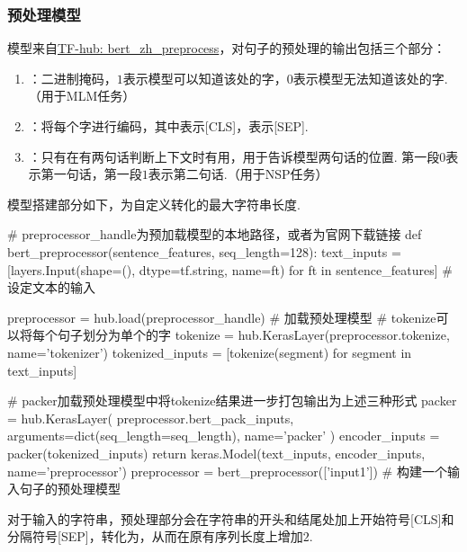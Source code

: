 \documentclass[12pt, a4paper, oneside]{ctexart}
\numberwithin{equation}{section}  %
\begin{document}
\subsubsection{预处理模型}
模型来自\href{https://tfhub.dev/tensorflow/bert_zh_preprocess/3}{TF-hub: bert\_zh\_preprocess}，对句子的预处理的输出包括三个部分：
\begin{enumerate}
  \item {}：二进制掩码，$1$表示模型可以知道该处的字，$0$表示模型无法知道该处的字.（用于MLM任务）
  \item {}：将每个字进行编码，其中表示[CLS]，表示[SEP].
  \item {}：只有在有两句话判断上下文时有用，用于告诉模型两句话的位置. 第一段$0$表示第一句话，第一段$1$表示第二句话.（用于NSP任务）
\end{enumerate}
模型搭建部分如下，为自定义转化的最大字符串长度.
\begin{pythoncode}
# preprocessor_handle为预加载模型的本地路径，或者为官网下载链接
def bert_preprocessor(sentence_features, seq_length=128):
    text_inputs = [layers.Input(shape=(), dtype=tf.string, name=ft)
                   for ft in sentence_features]  # 设定文本的输入
    
    preprocessor = hub.load(preprocessor_handle)  # 加载预处理模型
    # tokenize可以将每个句子划分为单个的字
    tokenize = hub.KerasLayer(preprocessor.tokenize, name='tokenizer')
    tokenized_inputs = [tokenize(segment) for segment in text_inputs]  

    # packer加载预处理模型中将tokenize结果进一步打包输出为上述三种形式
    packer = hub.KerasLayer(
        preprocessor.bert_pack_inputs,
        arguments=dict(seq_length=seq_length),
        name='packer'
    )
    encoder_inputs = packer(tokenized_inputs)
    return keras.Model(text_inputs, encoder_inputs, name='preprocessor')
preprocessor = bert_preprocessor(['input1'])  # 构建一个输入句子的预处理模型
\end{pythoncode}
对于输入的字符串，预处理部分会在字符串的开头和结尾处加上开始符号[CLS]和分隔符号[SEP]，转化为，从而在原有序列长度上增加$2$.
\end{document}
